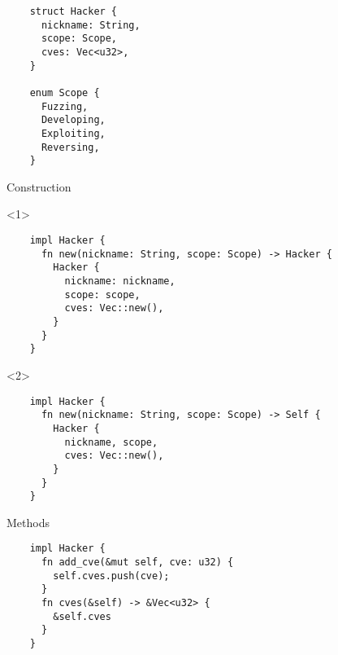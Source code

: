 \begin{frame}[fragile]{\insertsubsubsection}
  \begin{verbatim}
    struct Hacker {
      nickname: String,
      scope: Scope,
      cves: Vec<u32>,
    }

    enum Scope {
      Fuzzing,
      Developing,
      Exploiting,
      Reversing,
    }
  \end{verbatim}


\end{frame}

\begin{frame}[fragile]{Construction}
  \begin{onlyenv}<1>
  \begin{verbatim}
    impl Hacker {
      fn new(nickname: String, scope: Scope) -> Hacker {
        Hacker {
          nickname: nickname,
          scope: scope,
          cves: Vec::new(),
        }
      }
    }
  \end{verbatim}
  \end{onlyenv}
  \begin{onlyenv}<2>
  \begin{verbatim}
    impl Hacker {
      fn new(nickname: String, scope: Scope) -> Self {
        Hacker {
          nickname, scope,
          cves: Vec::new(),
        }
      }
    }
  \end{verbatim}
  \end{onlyenv}


\end{frame}

\begin{frame}[fragile]{Methods}
  \begin{verbatim}
    impl Hacker {
      fn add_cve(&mut self, cve: u32) {
        self.cves.push(cve);
      }
      fn cves(&self) -> &Vec<u32> {
        &self.cves
      }
    }
  \end{verbatim}


\end{frame}